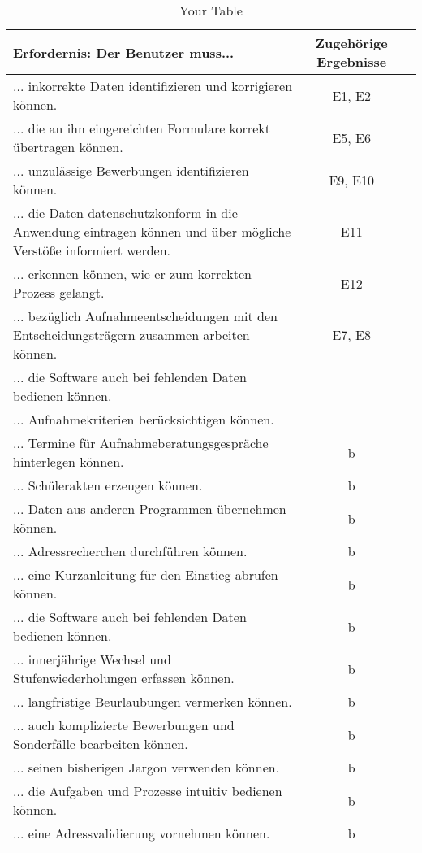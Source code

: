 \begin{landscape}
    \begin{longtable}{p{15cm}cc}
        \caption{Your Table} \label{tab:mytable} \\
        \toprule
        Erfordernis: Der Benutzer muss... & Zugehörige Ergebnisse \\
        \midrule
            ... inkorrekte Daten identifizieren und korrigieren können. & E1, E2 \\
            ... die an ihn eingereichten Formulare korrekt übertragen können. & E5, E6 \\
            ... unzulässige Bewerbungen identifizieren können. & E9, E10 \\
            ... die Daten datenschutzkonform in die Anwendung eintragen können und über mögliche Verstöße informiert werden. & E11 \\
            ... erkennen können, wie er zum korrekten Prozess gelangt. & E12 \\
            ... bezüglich Aufnahmeentscheidungen mit den Entscheidungsträgern zusammen arbeiten können. & E7, E8 \\
            ... die Software auch bei fehlenden Daten bedienen können.  & \\
            ... Aufnahmekriterien berücksichtigen können. & \\
            ... Termine für Aufnahmeberatungsgespräche hinterlegen können. & b \\
            ... Schülerakten erzeugen können. & b \\
            ... Daten aus anderen Programmen übernehmen können. & b \\
            ... Adressrecherchen durchführen können. & b \\
            ... eine Kurzanleitung für den Einstieg abrufen können. & b \\
            ... die Software auch bei fehlenden Daten bedienen können. & b \\
            ... innerjährige Wechsel und Stufenwiederholungen erfassen können. & b \\
            ... langfristige Beurlaubungen vermerken können. & b \\
            ... auch komplizierte Bewerbungen und Sonderfälle bearbeiten können. & b \\
            ... seinen bisherigen Jargon verwenden können. & b \\
            ... die Aufgaben und Prozesse intuitiv bedienen können. & b \\
            ... eine Adressvalidierung vornehmen können. & b \\

\end{longtable}
\end{landscape}
